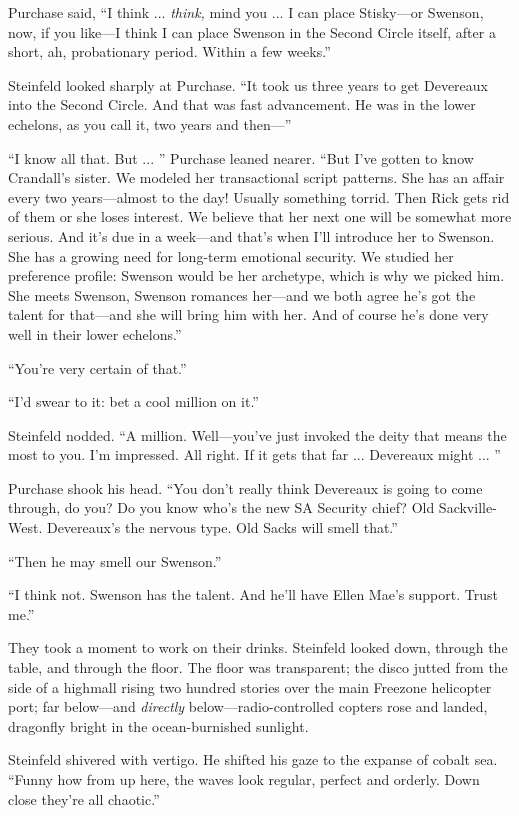 Purchase said, ``I think ... \textit{think,} mind you ... I can place Stisky---or Swenson, now, if you like---I think I can place Swenson in the Second Circle itself, after a short, ah, probationary period. Within a few weeks.''

Steinfeld looked sharply at Purchase. ``It took us three years to get Devereaux into the Second Circle. And that was fast advancement. He was in the lower echelons, as you call it, two years and then---''

``I know all that. But ... '' Purchase leaned nearer. ``But I've gotten to know Crandall's sister. We modeled her transactional script patterns. She has an affair every two years---almost to the day! Usually something torrid. Then Rick gets rid of them or she loses interest. We believe that her next one will be somewhat more serious. And it's due in a week---and that's when I'll introduce her to Swenson. She has a growing need for long-term emotional security. We studied her preference profile: Swenson would be her archetype, which is why we picked him. She meets Swenson, Swenson romances her---and we both agree he's got the talent for that---and she will bring him with her. And of course he's done very well in their lower echelons.''

``You're very certain of that.''

``I'd swear to it: bet a cool million on it.''

Steinfeld nodded. ``A million. Well---you've just invoked the deity that means the most to you. I'm impressed. All right. If it gets that far ... Devereaux might ... ''

Purchase shook his head. ``You don't really think Devereaux is going to come through, do you? Do you know who's the new SA Security chief? Old Sackville-West. Devereaux's the nervous type. Old Sacks will smell that.''

``Then he may smell our Swenson.''

``I think not. Swenson has the talent. And he'll have Ellen Mae's support. Trust me.''

They took a moment to work on their drinks. Steinfeld looked down, through the table, and through the floor. The floor was transparent; the disco jutted from the side of a highmall rising two hundred stories over the main Freezone helicopter port; far below---and \textit{directly} below---radio-controlled copters rose and landed, dragonfly bright in the ocean-burnished sunlight.

Steinfeld shivered with vertigo. He shifted his gaze to the expanse of cobalt sea. ``Funny how from up here, the waves look regular, perfect and orderly. Down close they're all chaotic.''

